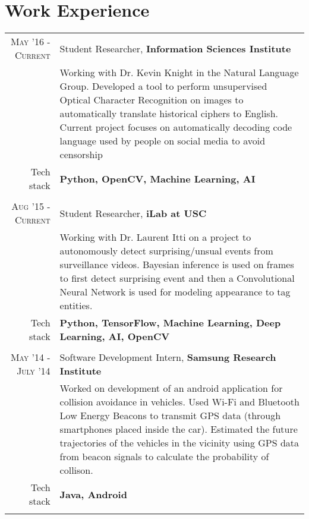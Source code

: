 \section{Work Experience}
\renewcommand{\arraystretch}{0.85}%
\begin{tabular}{r|p{13cm}}
\textsc{May '16 - Current} & Student Researcher, \textbf{Information Sciences Institute} \\
& \small{Working with Dr. Kevin Knight in the Natural Language Group. Developed a tool to perform unsupervised Optical Character Recognition on images to automatically translate historical ciphers to English. Current project focuses on automatically decoding code language used by people on social media to avoid censorship}\\
\small{Tech stack} &\footnotesize{\textbf{Python, OpenCV, Machine Learning, AI}} \\
\multicolumn{2}{c}{} \\

\textsc{Aug '15 - Current} & Student Researcher, \textbf{iLab at USC} \\
& \small{Working with Dr. Laurent Itti on a project to autonomously detect surprising/unsual events from surveillance videos. Bayesian inference is used on frames to first detect surprising event and then a Convolutional Neural Network is used for modeling appearance to tag entities.}\\
\small{Tech stack} &\footnotesize{\textbf{Python, TensorFlow, Machine Learning, Deep Learning, AI, OpenCV}} \\
\multicolumn{2}{c}{} \\

\textsc{May '14 - July '14 } & Software Development Intern, \textbf{Samsung Research Institute} \\
& \small{Worked on development of an android application for collision avoidance in vehicles. Used Wi-Fi and Bluetooth Low Energy Beacons to transmit GPS data (through smartphones placed inside the car). Estimated the future trajectories of the vehicles in the vicinity using GPS data from beacon signals to calculate the probability of collison.}\\
\small{Tech stack} &\footnotesize{\textbf{Java, Android}} \\
\multicolumn{2}{c}{}



\end{tabular}
